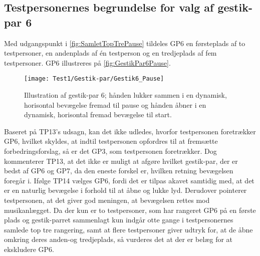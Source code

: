 \subsection{Testpersonernes begrundelse for valg af gestik-par 6}
\label{TestresultaterValgAfGestikkerBegrundelseGP6Pause}
%
Med udgangspunkt i \autoref{fig:SamletTopTrePause} tildeles GP6 en førsteplads af to testpersoner, en andenplads af én testperson og en tredjeplads af fem testpersoner. GP6 illustreres på \autoref{fig:GestikPar6Pause}.
%
\begin{figure}[H]
	\centering
	\texttt{[image: Test1/Gestik-par/Gestik6\_Pause]}
	\caption{Illustration af gestik-par 6; hånden lukker sammen i en dynamisk, horisontal bevægelse fremad til pause og hånden åbner i en dynamisk, horisontal fremad bevægelse til start.}
	\label{fig:GestikPar6Pause}
\end{figure}
\noindent
%
Baseret på TP13's udsagn, kan det ikke udledes, hvorfor testpersonen foretrækker GP6, hvilket skyldes, at indtil testpersonen opfordres til at fremsætte forbedringsforslag, så er det GP3, som testpersonen foretrækker. Dog kommenterer TP13, at det ikke er muligt at afgøre hvilket gestik-par, der er bedst af GP6 og GP7, da den eneste forskel er, hvilken retning bevægelsen foregår i. Ifølge TP14 vælges GP6, fordi det er tilpas akavet samtidig med, at det er en naturlig bevægelse i forhold til at åbne og lukke lyd. Derudover pointerer testpersonen, at det giver god meningen, at bevægelsen rettes mod musikanlægget. Da der kun er to testpersoner, som har rangeret GP6 på en første plads og gestik-parret sammenlagt kun indgår otte gange i testpersonernes samlede top tre rangering, samt at flere testpersoner giver udtryk for, at de åbne omkring deres anden-og tredjeplads, så vurderes det at der er belæg for at ekskludere GP6. 
%
